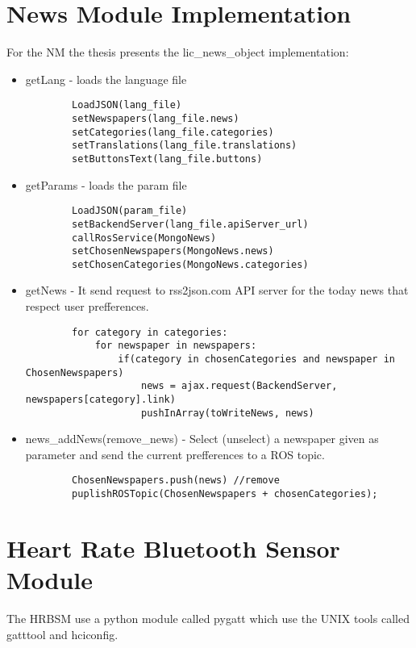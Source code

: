 \section{News Module Implementation}
\label{sec:implementation-newsapp}
For the NM the thesis presents the lic_news_object implementation:
\begin{itemize}
    \item getLang - loads the language file
    \begin{lstlisting}
        LoadJSON(lang_file)
        setNewspapers(lang_file.news)
        setCategories(lang_file.categories)
        setTranslations(lang_file.translations)
        setButtonsText(lang_file.buttons)
    \end{lstlisting}
    \item getParams - loads the param file
    \begin{lstlisting}
        LoadJSON(param_file)
        setBackendServer(lang_file.apiServer_url)
        callRosService(MongoNews)
        setChosenNewspapers(MongoNews.news)
        setChosenCategories(MongoNews.categories)
    \end{lstlisting}
    \item getNews - It send request to rss2json.com API server for the today news that respect user prefferences.
    \begin{lstlisting}
        for category in categories:
            for newspaper in newspapers:
                if(category in chosenCategories and newspaper in ChosenNewspapers)
                    news = ajax.request(BackendServer, newspapers[category].link)
                    pushInArray(toWriteNews, news)
    \end{lstlisting}
    \item news_addNews(remove_news) - Select (unselect) a newspaper given as parameter and send the current prefferences to a ROS topic.
    \begin{lstlisting}
        ChosenNewspapers.push(news) //remove
        puplishROSTopic(ChosenNewspapers + chosenCategories);
    \end{lstlisting}
\end{itemize}


\section{Heart Rate Bluetooth Sensor Module}
\label{sec:implementation-heartrate}
The HRBSM use a python module called pygatt which use the UNIX tools called
gatttool and hciconfig.

